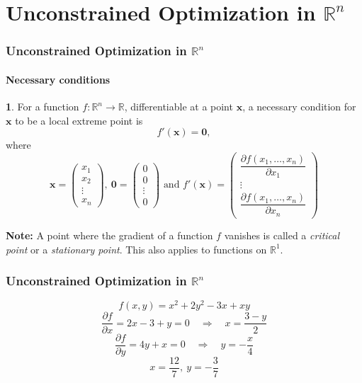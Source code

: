 \documentclass[10pt]{beamer}
\theoremstyle{definition}
\newtheorem{Fact}{\translate{Fact}}
\begin{document}
\section{Unconstrained Optimization in $ \mathbb{R}^n $}\label{sec:Rn}

\begin{frame}[fragile]
\frametitle{Unconstrained Optimization in $ \mathbb{R}^n $}
\framesubtitle{Necessary conditions}
\begin{Fact}
For a function $ f: \mathbb{R}^n \rightarrow \mathbb{R}$, differentiable at a point $ \mathbf{x} $, a necessary condition for $ \mathbf{x} $ to be a local extreme point is \[ f'(\mathbf{x}) = \mathbf{0}, \]
where \[ \mathbf{x} = \left( \begin{array}{c}
x_1 \\
x_2\\
\vdots \\
x_n
\end{array}\right),~\mathbf{0} = \left( \begin{array}{c}
0 \\
0 \\
\vdots \\
0
\end{array}\right)\text{ and }  f'(\mathbf{x}) = \left( \begin{array}{c}
\dfrac{\partial f(x_1,\ldots,x_n)}{\partial x_1}\\
\vdots \\
\dfrac{\partial f(x_1,\ldots,x_n)}{\partial x_n}
\end{array}\right) \]
\label{fc:NCsRn}
\end{Fact}

\textbf{Note:} A point where the gradient of a function $ f $ vanishes is called a \emph{critical point} or a \emph{stationary point}. This also applies to functions on $ \mathbb{R}^1 $.
\end{frame}

\begin{frame}[fragile]
\frametitle{Unconstrained Optimization in $ \mathbb{R}^n $}
\begin{example}
\[ f(x,y) = x^2 +2y^2-3x+xy \]
\[ \frac{\partial f}{\partial x} = 2x-3+y=0\quad \Rightarrow \quad x=\frac{3-y}{2} \]
\[ \frac{\partial f}{\partial y} = 4y+x = 0\quad \Rightarrow \quad y = -\frac{x}{4}\]
\[ x=\frac{12}{7},~y=-\frac{3}{7} \]
\label{ex:locminR2}
\end{example}
\end{frame}
\end{document}

